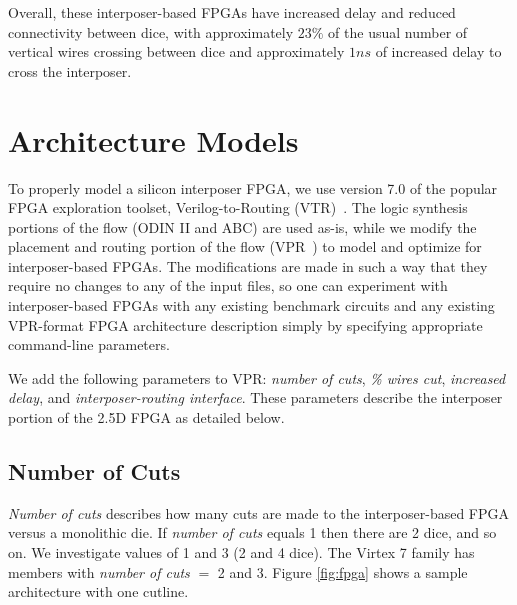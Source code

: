 \documentclass[journal]{IEEEtran}
\begin{document}
Overall, these interposer-based FPGAs have increased delay and reduced connectivity between dice, with approximately $23\%$ of the usual number of vertical wires crossing between dice and approximately $1ns$ of increased delay to cross the interposer.

\section{Architecture Models}
\label{archSection}
To properly model a silicon interposer FPGA, we use version 7.0 of the popular FPGA exploration toolset, Verilog-to-Routing (VTR)~\cite{luu2014vtr}. The logic synthesis portions of the flow (ODIN II and  ABC) are used as-is, while we modify the placement and routing portion of the flow (VPR~\cite{betz1997vpr}) to model and optimize for interposer-based FPGAs. The modifications are made in such a way that they require no changes to any of the input files, so one can experiment with interposer-based FPGAs with any existing benchmark circuits and any existing VPR-format FPGA architecture description simply by specifying appropriate command-line parameters.

We add the following parameters to VPR: \textit{number of cuts}, \textit{\% wires cut}, \textit{increased delay}, and \textit{interposer-routing interface}. These parameters describe the interposer portion of the 2.5D FPGA as detailed below.

\subsection{Number of Cuts}
\textit{Number of cuts} describes how many cuts are made to the interposer-based FPGA versus a monolithic die. If \textit{number of cuts} equals 1 then there are 2 dice, and so on. We investigate values of 1 and 3 (2 and 4 dice). The Virtex 7 family has members with \textit{number of cuts} $=$ 2 and 3. Figure \ref{fig:fpga} shows a sample architecture with one cutline.
\end{document}
